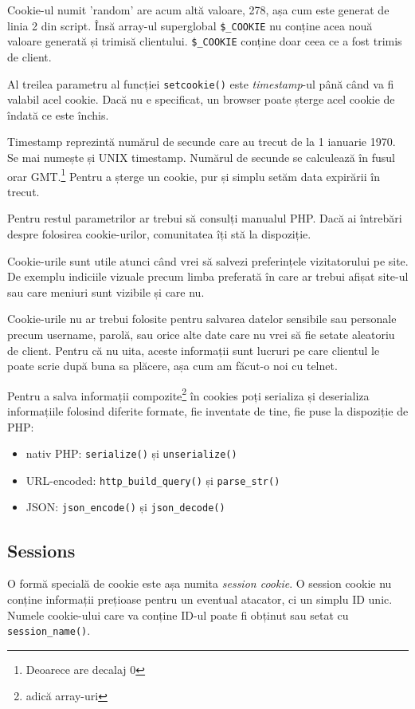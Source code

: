 Cookie-ul numit 'random' are acum altă valoare, 278, așa cum este generat de linia 2 din script. \^Insă
array-ul superglobal \texttt{\$\_COOKIE} nu conține acea nouă valoare generată și trimisă
clientului. \texttt{\$\_COOKIE} conține doar ceea ce a fost trimis de client.


Al treilea parametru al funcției \texttt{setcookie()} este \textsl{timestamp}-ul p\^ană
c\^and va fi valabil acel cookie. Dacă nu e specificat, un browser poate
șterge acel cookie de \^indată ce este \^inchis. 

Timestamp reprezintă numărul de secunde care au trecut de la 1 ianuarie 1970. Se mai numește
și UNIX timestamp. Numărul de secunde se calculează \^in fusul orar GMT.\footnote{Deoarece
are decalaj 0} Pentru a șterge un cookie, pur și simplu setăm data expirării \^in trecut.

Pentru restul parametrilor ar trebui să consulți manualul PHP. Dacă ai \^intrebări
despre folosirea cookie-urilor, comunitatea {\phpro} \^iți stă la dispoziție.

Cookie-urile sunt utile atunci c\^and vrei să salvezi preferințele vizitatorului
pe site. De exemplu indiciile vizuale precum limba preferată \^in care ar
trebui afișat site-ul sau care meniuri sunt vizibile și care nu.

Cookie-urile nu ar trebui folosite pentru salvarea datelor sensibile sau personale
precum username, parolă, sau orice alte date care nu vrei să fie setate aleatoriu
de client. Pentru că nu uita, aceste informații sunt lucruri pe care
clientul le poate scrie după buna sa plăcere, așa cum am făcut-o noi cu telnet.

Pentru a salva informații compozite\footnote{adică array-uri} \^in cookies
poți serializa
și deserializa informațiile folosind diferite formate, fie inventate de tine,
fie puse la dispoziție de PHP:
\begin{itemize}
 \item nativ PHP: \texttt{serialize()} și \texttt{unserialize()}
 \item URL-encoded: \texttt{http\_build\_query()} și \texttt{parse\_str()}
 \item JSON: \texttt{json\_encode()} și \texttt{json\_decode()}
\end{itemize}


\subsection{Sessions}
O formă {\glqq}specială{\grqq} de cookie este așa numita \textsl{session cookie}.
O session cookie nu conține informații prețioase pentru un eventual atacator,
ci un simplu ID unic. Numele cookie-ului care va conține ID-ul poate fi
obținut sau setat cu \texttt{session\_name()}.

